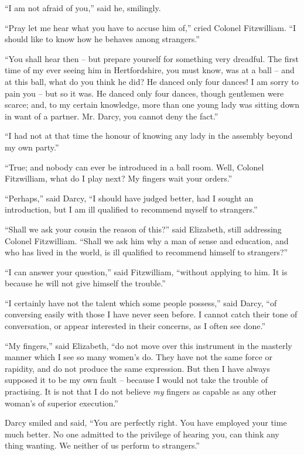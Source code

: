 “I am not afraid of you,” said he, smilingly.

“Pray let me hear what you have to accuse him of,”
cried Colonel Fitzwilliam. “I should like to know how
he behaves among strangers.”

“You shall hear then -- but prepare yourself for something
very dreadful. The first time of my ever seeing
him in Hertfordshire, you must know, was at a ball -- and
at this ball, what do you think he did? He danced
only four dances! I am sorry to pain you -- but so it was.
He danced only four dances, though gentlemen were
scarce; and, to my certain knowledge, more than one
young lady was sitting down in want of a partner. Mr.
Darcy, you cannot deny the fact.”

“I had not at that time the honour of knowing any
lady in the assembly beyond my own party.”

“True; and nobody can ever be introduced in a ball
room. Well, Colonel Fitzwilliam, what do I play next?
My fingers wait your orders.”

“Perhaps,” said Darcy, “I should have judged better,
had I sought an introduction, but I am ill qualified to
recommend myself to strangers.”

“Shall we ask your cousin the reason of this?” said
Elizabeth, still addressing Colonel Fitzwilliam. “Shall
we ask him why a man of sense and education, and who
has lived in the world, is ill qualified to recommend himself
to strangers?”

“I can answer your question,” said Fitzwilliam, “without
applying to him. It is because he will not give himself
the trouble.”

“I certainly have not the talent which some people
possess,” said Darcy, “of conversing easily with those
I have never seen before. I cannot catch their tone of
conversation, or appear interested in their concerns, as
I often see done.”

“My fingers,” said Elizabeth, “do not move over this
instrument in the masterly manner which I see so many
women’s do. They have not the same force or rapidity,
and do not produce the same expression. But then I have
always supposed it to be my own fault -- because I would
not take the trouble of practising. It is not that I do not
believe \textit{my} fingers as capable as any other woman’s of
superior execution.”

Darcy smiled and said, “You are perfectly right. You
have employed your time much better. No one admitted
to the privilege of hearing you, can think any thing wanting.
We neither of us perform to strangers.”

